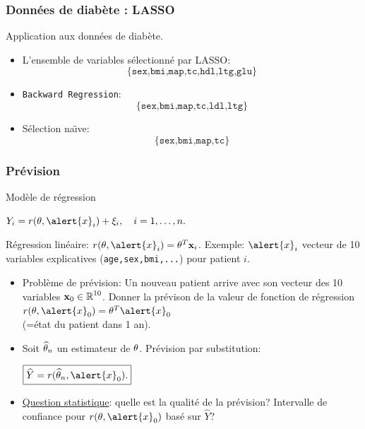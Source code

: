 \begin{frame}
\frametitle{Données de diabète : LASSO}

Application aux données de diabète.

\begin{itemize}
\item  L'ensemble de variables sélectionné par LASSO:
$$
\{\texttt{sex,bmi,map,tc,hdl,ltg,glu}\}
$$
\item \texttt{Backward Regression}:
$$
\{\texttt{sex,bmi,map,tc,ldl,ltg}\}
$$
\item Sélection na\"{\i}ve:
$$
\{\texttt{sex,bmi,map,tc}\}
$$
\end{itemize}
\end{frame}



\begin{frame}
\frametitle{Prévision}

Modèle de régression \vspace{2mm} \centerline{$ Y_i=
r(\truetheta, \alert{x}_i)+\xi_i, \quad i=1,\dots,n.$} Régression
\alert{linéaire}: $r(\truetheta, \alert{x}_i)=\truetheta^T{\bf
x}_i$. Exemple: $\alert{x}_i$ vecteur de 10 variables explicatives
(\texttt{age,sex,bmi,...}) pour patient $i$.
\begin{itemize}
\item \alert{Problème de prévision}:
Un nouveau patient arrive avec son vecteur des 10 variables ${\bf
x}_0\in \operatorname{{\mathbb R}}^{10}$. Donner la prévison de la valeur de fonction de
régression $r(\truetheta, \alert{x}_0)=\truetheta^T\alert{x}_0$\\
(=état du patient dans 1 an).
\item Soit $\operatorname{\widehat \theta_{\mathnormal{n}}}$ un estimateur de $\theta$. \alert{Prévision par
substitution:}
 \centerline{$\boxed{ \widehat Y = r(\est, \alert{x}_0).}$}
\item \underline{Question statistique}: quelle est la qualité de la prévision?
\alert{Intervalle de confiance} pour $r(\truetheta, \alert{x}_0)$
basé sur $\widehat Y$?
\end{itemize}
\end{frame}

